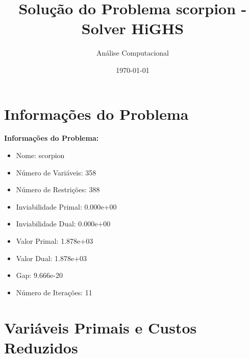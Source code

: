 \documentclass[12pt]{article}
\title{Solução do Problema scorpion - Solver HiGHS}
\author{Análise Computacional}
\date{\today}
\begin{document}
\maketitle

\section{Informações do Problema}

\textbf{Informações do Problema:}
\begin{itemize}
\item Nome: scorpion
\item Número de Variáveis: 358
\item Número de Restrições: 388
\item Inviabilidade Primal: 0.000e+00
\item Inviabilidade Dual: 0.000e+00
\item Valor Primal: 1.878e+03
\item Valor Dual: 1.878e+03
\item Gap: 9.666e-20
\item Número de Iterações: 11
\end{itemize}


\section{Variáveis Primais e Custos Reduzidos}
\end{document}
